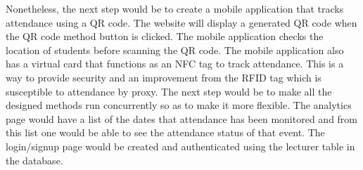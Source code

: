 Nonetheless, the next step would be to create a mobile application that tracks attendance using a QR code. The website will display a generated QR code when the QR code method button is clicked. The mobile application checks the location of students before scanning the QR code. The mobile application also has a virtual card that functions as an NFC tag to track attendance. This is a way to provide security and an improvement from the RFID tag which is susceptible to attendance by proxy. The next step would be to make all the designed methods run concurrently so as to make it more flexible. The analytics page would have a list of the dates that attendance has been monitored and from this list one would be able to see the attendance status of that event. The login/signup page would be created and authenticated using the lecturer table in the database.


